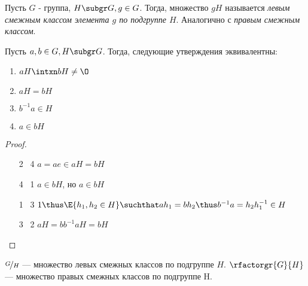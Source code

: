 \begin{definition}
  Пусть $G$ - группа, $H \subgr G, g \in G$. Тогда, множество $gH$ называется \emph{левым смежным классом элемента $g$ по подгруппе $H$}. Аналогично с \emph{правым смежным классом}.
\end{definition}

\begin{theorem}\label{th:comclasses}
  Пусть $a, b \in G, H \subgr G$. Тогда, следующие утверждения эквивалентны:
  \begin{enumerate}
    \item $aH \intxn bH \neq \O$
    \item $aH=bH$
    \item $b^{-1} a \in H$
    \item $a \in bH$
  \end{enumerate}
\end{theorem}
\begin{proof}
  \theoremlistshack
  \begin{enumerate}[leftmargin=10ex]
    \item [2 \rightarrow\ 4] $a=ae \in aH = bH$
    \item [4 \rightarrow\ 1] $a \in bH$, но $a \in bH$
    \item [1 \rightarrow\ 3] $1 \thus \E{h_1, h_2\in H}\suchthat ah_1=bh_2\thus b^{-1} a=h_2h_1^{-1}\in H$
    \item [3 \rightarrow\ 2] $aH=bb^{-1} aH=bH$
  \end{enumerate}
\end{proof}

\begin{denotation}
  $\factorgr{G}{H}$ --- множество левых смежных классов по подгруппе $H$. $\rfactorgr{G}{H}$ --- множество правых смежных классов по подгруппе H.
\end{denotation}


